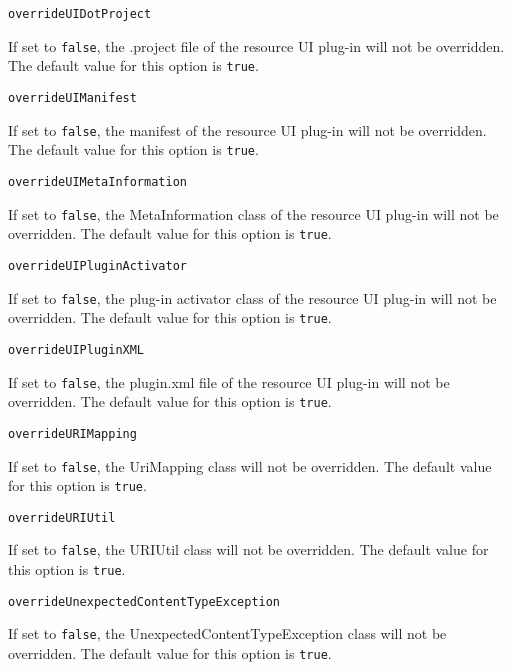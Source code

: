 \noindent\texttt{overrideUIDotProject}
\begin{myindentpar}{1cm}
If set to \texttt{false}, the .project file of the resource UI plug-in will not be overridden. The default value for this option is \texttt{true}.
\end{myindentpar}

\noindent\texttt{overrideUIManifest}
\begin{myindentpar}{1cm}
If set to \texttt{false}, the manifest of the resource UI plug-in will not be overridden. The default value for this option is \texttt{true}.
\end{myindentpar}

\noindent\texttt{overrideUIMetaInformation}
\begin{myindentpar}{1cm}
If set to \texttt{false}, the MetaInformation class of the resource UI plug-in will not be overridden. The default value for this option is \texttt{true}.
\end{myindentpar}

\noindent\texttt{overrideUIPluginActivator}
\begin{myindentpar}{1cm}
If set to \texttt{false}, the plug-in activator class of the resource UI plug-in will not be overridden. The default value for this option is \texttt{true}.
\end{myindentpar}

\noindent\texttt{overrideUIPluginXML}
\begin{myindentpar}{1cm}
If set to \texttt{false}, the plugin.xml file of the resource UI plug-in will not be overridden. The default value for this option is \texttt{true}.
\end{myindentpar}

\noindent\texttt{overrideURIMapping}
\begin{myindentpar}{1cm}
If set to \texttt{false}, the UriMapping class will not be overridden. The default value for this option is \texttt{true}.
\end{myindentpar}

\noindent\texttt{overrideURIUtil}
\begin{myindentpar}{1cm}
If set to \texttt{false}, the URIUtil class will not be overridden. The default value for this option is \texttt{true}.
\end{myindentpar}

\noindent\texttt{overrideUnexpectedContentTypeException}
\begin{myindentpar}{1cm}
If set to \texttt{false}, the UnexpectedContentTypeException class will not be overridden. The default value for this option is \texttt{true}.
\end{myindentpar}

